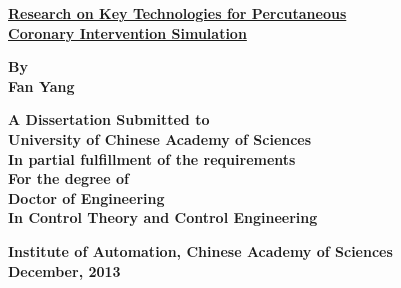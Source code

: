 
{\renewcommand{\baselinestretch}{1.0}

\thispagestyle{empty} %

\vspace*{0.5cm} %
\begin{center}
  {\xiaoerhao \hei \textsf{\textbf{\underline{Research on Key Technologies for Percutaneous}\\
  \underline{Coronary Intervention Simulation}}}}
\end{center}

\vspace*{3.5cm} %
\begin{center}

\textsf{\sanhao \textrm{\textbf{By}}}\\
\textsf{\sanhao \textrm{\textbf{Fan Yang}}}

\vspace*{2.0cm} %
\xiaosihao \textrm{\textbf{ A Dissertation Submitted to\\
University of Chinese Academy of Sciences\\
In partial fulfillment of the requirements\\
For the degree of\\
Doctor of Engineering\\
In Control Theory and Control Engineering}}
\end{center}

\begin{center}
\vspace{1.5cm}
\xiaosihao \textrm{\textbf{Institute of Automation, Chinese Academy of Sciences}}\\
\wuhao \textrm{\textbf{December, 2013}}
\end{center}
} 